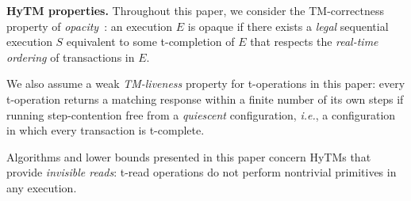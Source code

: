 %
\vspace{1mm}\noindent\textbf{HyTM properties.}
Throughout this paper, we consider the TM-correctness property of \emph{opacity}~\cite{tm-book}: an execution
$E$ is opaque if there exists a \emph{legal} sequential execution $S$ equivalent to some t-completion of $E$
that respects the \emph{real-time ordering} of transactions in $E$.

We also assume a weak \emph{TM-liveness} property for t-operations in this paper: every t-operation returns a matching
response within a finite number of its own steps if running step-contention free from a \emph{quiescent} configuration,
\emph{i.e.}, a configuration in which every transaction is t-complete.

Algorithms and lower bounds presented in this paper concern HyTMs that provide \emph{invisible reads}: t-read operations do not perform
nontrivial primitives in any execution.
%
%
% 	 
%
